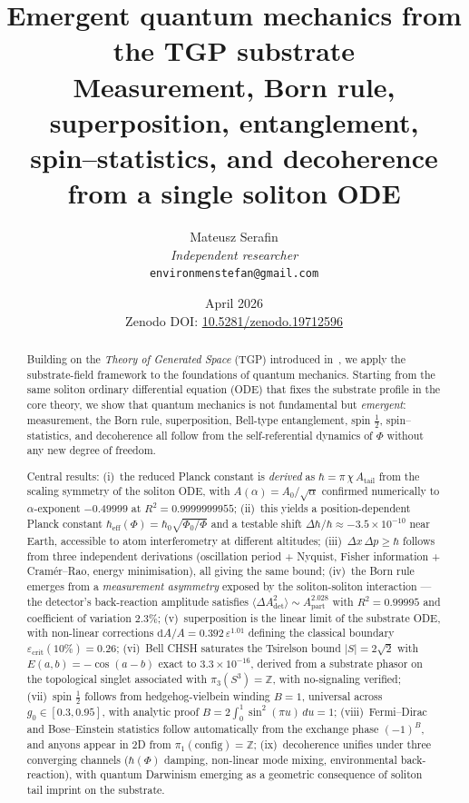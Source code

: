 \documentclass[11pt,a4paper]{article}
\title{%
  \textbf{Emergent quantum mechanics from the TGP substrate}\\[4pt]
  \large Measurement, Born rule, superposition, entanglement,\\
  \large spin--statistics, and decoherence from a single soliton ODE%
}
\author{Mateusz Serafin\\[2pt]
\small\textit{Independent researcher}\\[-2pt]
\small\texttt{environmenstefan@gmail.com}}
\date{April 2026\\[4pt]
\small Zenodo DOI: \href{https://doi.org/10.5281/zenodo.19712596}{10.5281/zenodo.19712596}}
\renewcommand{\Phi}{\varPhi}
\newcommand{\PhiZero}{\varPhi_{0}}
\newcommand{\Atail}{A_{\mathrm{tail}}}
\newcommand{\AdetSym}{A_{\mathrm{det}}}
\newcommand{\ApartSym}{A_{\mathrm{part}}}
\newcommand{\chiTGP}{\chi}
\newcommand{\hbareff}{\hbar_{\mathrm{eff}}}
\newcommand{\hbarzero}{\hbar_{0}}
\newcommand{\Nwind}{B}
\newcommand{\pithreeS}{\pi_{3}(S^{3})}
\newcommand{\eps}{\varepsilon}
\begin{document}
\maketitle

\begin{abstract}
Building on the \emph{Theory of Generated Space} (TGP) introduced
in~\cite{TGP-core}, we apply the substrate-field framework to the
foundations of quantum mechanics. Starting from the same soliton
ordinary differential equation (ODE) that fixes the substrate profile
in the core theory, we show that quantum mechanics is not fundamental
but \emph{emergent}: measurement, the Born rule, superposition,
Bell-type entanglement, spin $\tfrac{1}{2}$, spin--statistics, and
decoherence all follow from the self-referential dynamics of $\Phi$
without any new degree of freedom.

Central results:
(i)~the reduced Planck constant is \emph{derived} as
$\hbar=\pi\,\chiTGP\,\Atail$ from the scaling symmetry of the soliton
ODE, with $A(\alpha)=A_{0}/\sqrt{\alpha}$ confirmed numerically to
$\alpha$-exponent $-0.49999$ at $R^{2}=0.9999999955$;
(ii)~this yields a position-dependent Planck constant
$\hbareff(\Phi)=\hbarzero\sqrt{\PhiZero/\Phi}$ and a testable shift
$\Delta\hbar/\hbar\approx-3.5\times 10^{-10}$ near Earth, accessible
to atom interferometry at different altitudes;
(iii)~$\Delta x\,\Delta p\geq\hbar$ follows from three independent
derivations (oscillation period + Nyquist, Fisher information + Cram\'er--Rao,
energy minimisation), all giving the same bound;
(iv)~the Born rule emerges from a \emph{measurement asymmetry}
exposed by the soliton-soliton interaction --- the detector's
back-reaction amplitude satisfies
$\langle\Delta\AdetSym^{2}\rangle \sim \ApartSym^{2.028}$
with $R^{2}=0.99995$ and coefficient of variation $2.3\%$;
(v)~superposition is the linear limit of the substrate ODE, with
non-linear corrections $\mathrm{d}A/A=0.392\,\eps^{1.01}$ defining
the classical boundary $\eps_{\mathrm{crit}}(10\%)=0.26$;
(vi)~Bell CHSH saturates the Tsirelson bound $|S|=2\sqrt{2}$ with
$E(a,b)=-\cos(a-b)$ exact to $3.3\times10^{-16}$, derived from a
substrate phasor on the topological singlet associated with
$\pithreeS=\mathbb{Z}$, with no-signaling verified;
(vii)~spin $\tfrac{1}{2}$ follows from hedgehog-vielbein winding
$\Nwind=1$, universal across $g_{0}\in[0.3,0.95]$, with analytic proof
$\Nwind=2\int_{0}^{1}\sin^{2}(\pi u)\,du=1$;
(viii)~Fermi--Dirac and Bose--Einstein statistics follow automatically
from the exchange phase $(-1)^{\Nwind}$, and anyons appear in 2D from
$\pi_{1}(\text{config})=\mathbb{Z}$;
(ix)~decoherence unifies under three converging channels
($\hbar(\Phi)$ damping, non-linear mode mixing, environmental
back-reaction), with quantum Darwinism emerging as a geometric
consequence of soliton tail imprint on the substrate.
\end{abstract}
\end{document}
